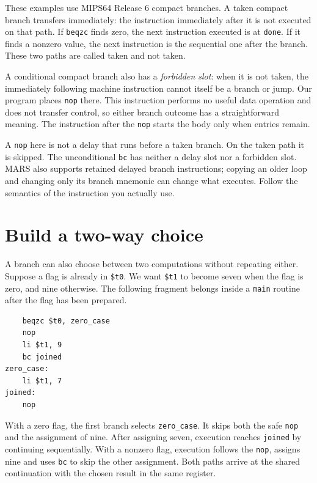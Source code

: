 These examples use MIPS64 Release 6 compact branches. A taken compact branch
transfers immediately: the instruction immediately after it is not executed on
that path. If \texttt{beqzc} finds zero, the next instruction executed is at
\texttt{done}. If it finds a nonzero value, the next instruction is the sequential
one after the branch. These two paths are called taken and not taken.

A conditional compact branch also has a \emph{forbidden slot}: when it is not
taken, the immediately following machine instruction cannot itself be a branch
or jump. Our program places \texttt{nop} there. This instruction performs no
useful data operation and does not transfer control, so either branch outcome
has a straightforward meaning. The instruction after the \texttt{nop} starts the
body only when entries remain.

A \texttt{nop} here is not a delay that runs before a taken branch. On the taken
path it is skipped. The unconditional \texttt{bc} has neither a delay slot nor a
forbidden slot. MARS also supports retained delayed branch instructions; copying
an older loop and changing only its branch mnemonic can change what executes.
Follow the semantics of the instruction you actually use.

\section{Build a two-way choice}

A branch can also choose between two computations without repeating either.
Suppose a flag is already in \texttt{\$t0}. We want \texttt{\$t1} to become
seven when the flag is zero, and nine otherwise. The following fragment belongs
inside a \texttt{main} routine after the flag has been prepared.

\begin{verbatim}
    beqzc $t0, zero_case
    nop
    li $t1, 9
    bc joined
zero_case:
    li $t1, 7
joined:
    nop
\end{verbatim}

With a zero flag, the first branch selects \texttt{zero\_case}. It skips both
the safe \texttt{nop} and the assignment of nine. After assigning seven,
execution reaches \texttt{joined} by continuing sequentially. With a nonzero
flag, execution follows the \texttt{nop}, assigns nine and uses \texttt{bc} to
skip the other assignment. Both paths arrive at the shared continuation with
the chosen result in the same register.

